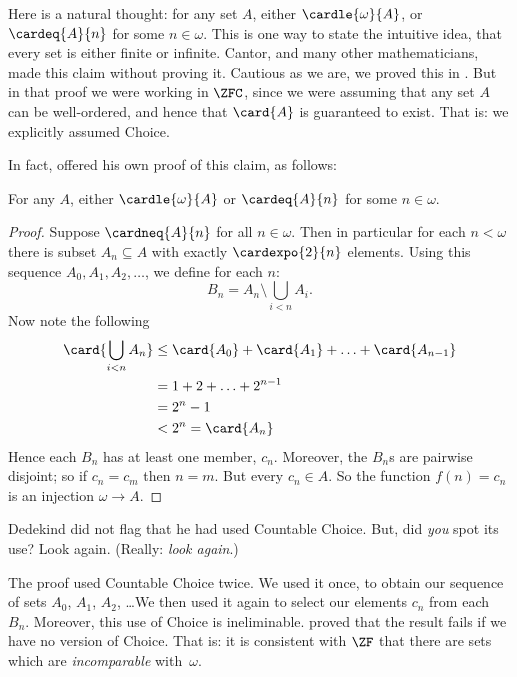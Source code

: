 \documentclass[../../../include/open-logic-section]{subfiles}
\begin{document}
\begin{ex}
Here is a natural thought: for any set $A$, either
$\cardle{\omega}{A}$, or $\cardeq{A}{n}$ for some $n \in \omega$. This
is one way to state the intuitive idea, that every set is either
finite or infinite. Cantor, and many other mathematicians, made this
claim without proving it. Cautious as we are, we proved this in
. But
in that proof we were working in $\ZFC$, since we were assuming that
any set $A$ can be well-ordered, and hence that $\card{A}$ is
guaranteed to exist. That is: we explicitly assumed Choice.

In fact, \cite{Dedekind1888} offered his own proof of
this claim, as follows:

\begin{thm}
For any $A$, either $\cardle{\omega}{A}$ or $\cardeq{A}{n}$ for some
$n \in \omega$.
\end{thm}

\begin{proof}
Suppose $\cardneq{A}{n}$ for all $n \in \omega$. Then in particular
for each $n < \omega$ there is subset $A_n \subseteq A$ with exactly
$\cardexpo{2}{n}$ elements. Using this sequence $A_0, A_1, A_2,
\ldots$, we define for each $n$:
\[
	B_n = A_n \setminus \bigcup_{i < n} A_i.
\]
Now note the following
\begin{align*}
	\card{\bigcup_{i < n}A_n} 
	&\leq \card{A_0} + \card{A_1} + \ldots + \card{A_{n-1}}\\
	&=1 + 2 + \ldots + 2^{n-1}\\
	& = 2^n - 1\\
	& < 2^n = \card{A_n}
\end{align*}
Hence each $B_n$ has at least one member, $c_n$. Moreover, the $B_n$s
are pairwise disjoint; so if $c_n = c_m$ then $n = m$. But every $c_n
\in A$. So the function  $f(n) = c_n$ is an injection $\omega \to A$.
\end{proof}
\noindent 
Dedekind did not flag that he had used Countable Choice. But, did
\emph{you} spot its use? Look again. (Really: \emph{look again}.)

The proof used Countable Choice twice. We used it once, to obtain
our sequence of sets $A_0$, $A_1$, $A_2$, \dots\@ We then used it
again to select our elements $c_n$ from each~$B_n$. Moreover, this use
of Choice is ineliminable. \cite[p.~138]{Cohen1966} proved that the
result fails if we have no version of Choice. That is: it is
consistent with $\ZF$ that there are sets which are
\emph{incomparable} with~$\omega$.
\end{ex}
\end{document}
